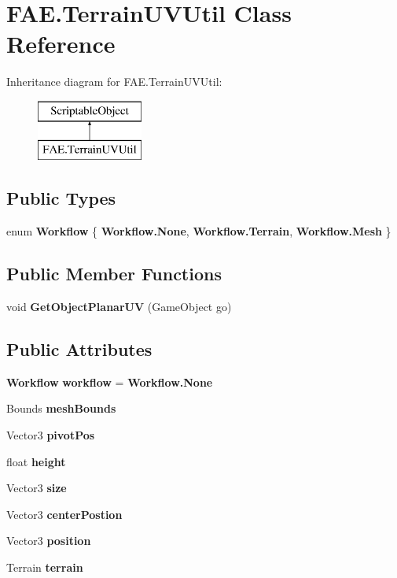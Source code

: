 \section{F\+A\+E.\+Terrain\+U\+V\+Util Class Reference}
\label{class_f_a_e_1_1_terrain_u_v_util}
Inheritance diagram for F\+A\+E.\+Terrain\+U\+V\+Util\+:\begin{figure}[H]
\begin{center}
\leavevmode
\includegraphics[height=2.000000cm]{class_f_a_e_1_1_terrain_u_v_util}
\end{center}
\end{figure}
\subsection*{Public Types}
\begin{DoxyCompactItemize}
\item 
enum \textbf{ Workflow} \{ \textbf{ Workflow.\+None}, 
\textbf{ Workflow.\+Terrain}, 
\textbf{ Workflow.\+Mesh}
 \}
\end{DoxyCompactItemize}
\subsection*{Public Member Functions}
\begin{DoxyCompactItemize}
\item 
void \textbf{ Get\+Object\+Planar\+UV} (Game\+Object go)
\end{DoxyCompactItemize}
\subsection*{Public Attributes}
\begin{DoxyCompactItemize}
\item 
\textbf{ Workflow} \textbf{ workflow} = \textbf{ Workflow.\+None}
\item 
Bounds \textbf{ mesh\+Bounds}
\item 
Vector3 \textbf{ pivot\+Pos}
\item 
float \textbf{ height}
\item 
Vector3 \textbf{ size}
\item 
Vector3 \textbf{ center\+Postion}
\item 
Vector3 \textbf{ position}
\item 
Terrain \textbf{ terrain}
\end{DoxyCompactItemize}


